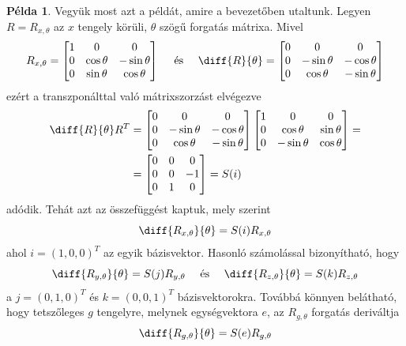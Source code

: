 \documentclass[12pt,a4paper]{report}
\theoremstyle{remark}
\theoremstyle{definition}
\newtheorem{pl}{Példa}[section]
\begin{document}
\begin{pl}
Vegyük most azt a példát, amire a bevezetőben utaltunk. Legyen $R = R_{x, \theta}$ az $x$ tengely körüli, $\theta$ 
szögű forgatás mátrixa. Mivel
\begin{equation}
R_{x, \theta} = 
    \begin{bmatrix}
    1 & 0 & 0 \\ 
    0 & \cos \theta & -\sin \theta \\ 
    0 & \sin \theta & \cos \theta
    \end{bmatrix}
\quad\textrm{ és }\quad 
\diff{R}{\theta} = 
    \begin{bmatrix}
    0 & 0 & 0 \\ 
    0 & -\sin \theta & -\cos \theta \\ 
    0 & \cos \theta & -\sin \theta
    \end{bmatrix} 
\end{equation}
ezért a transzponálttal való mátrixszorzást elvégezve
\begin{equation}
\begin{aligned}
\diff{R}{\theta}R^T &= 
    \begin{bmatrix}
    0 & 0 & 0 \\ 
    0 & -\sin \theta & -\cos \theta \\ 
    0 & \cos \theta & -\sin \theta
    \end{bmatrix} 
    \begin{bmatrix}
    1 & 0 & 0 \\ 
    0 & \cos \theta & \sin \theta \\ 
    0 & -\sin \theta & \cos \theta
    \end{bmatrix} = \\
&= \begin{bmatrix}
0 & 0 & 0 \\ 
0 & 0 & -1 \\ 
0 & 1 & 0
\end{bmatrix} 
= S(i)
\end{aligned}
\end{equation}
adódik. Tehát azt az összefüggést kaptuk, mely szerint 
\begin{equation}
\diff{R_{x, \theta}}{\theta} = S(i)R_{x, \theta}
\end{equation}
ahol $i = (1, 0, 0)^T$ az egyik bázisvektor. Hasonló számolással bizonyítható, hogy
\begin{equation}
\diff{R_{y, \theta}}{\theta} = S(j)R_{y, \theta} \quad\textrm{ és }\quad \diff{R_{z, \theta}}{\theta} = S(k)R_{z, 
\theta}
\end{equation}
a $j = (0, 1, 0)^T$ és $k = (0, 0, 1)^T$ bázisvektorokra. Továbbá könnyen belátható, hogy tetszőleges $g$ tengelyre, 
melynek egységvektora $e$, az $R_{g, \theta}$ forgatás deriváltja
\begin{equation}
\diff{R_{g, \theta}}{\theta} = S(e)R_{g, \theta}
\end{equation}
\end{pl}
\end{document}
